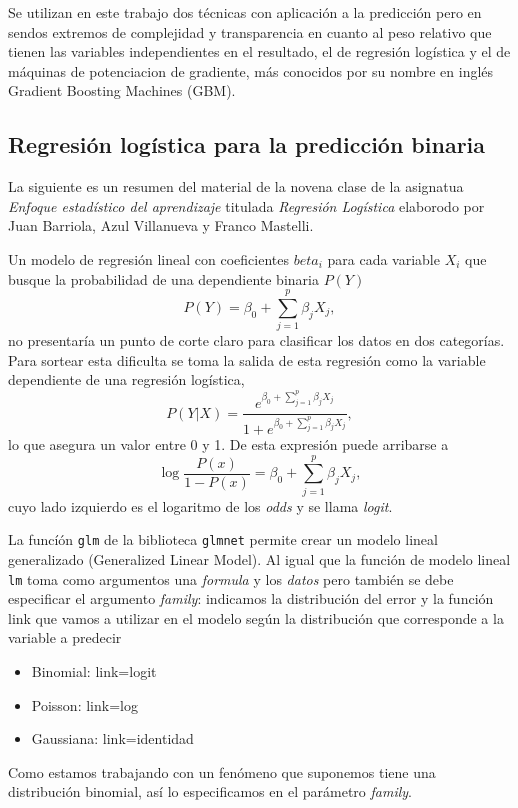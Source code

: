 \documentclass[a4paper]{report}
\begin{document}
Se utilizan en este trabajo dos técnicas con aplicación a la predicción pero en sendos extremos de complejidad y transparencia en cuanto al peso relativo que tienen las variables independientes en el resultado, el de regresión logística y el de máquinas de potenciacion de gradiente, más conocidos por su nombre en inglés Gradient Boosting Machines (GBM).


\subsection{Regresión logística para la predicción binaria}

La siguiente es un resumen del material de la novena clase de la asignatua \emph{Enfoque estadístico del aprendizaje} titulada \emph{Regresión Logística} elaborodo por Juan Barriola, Azul Villanueva y Franco Mastelli. 

Un modelo de regresión lineal con coeficientes \(beta_i\) para cada variable \(X_i\) que busque la probabilidad de una dependiente binaria \(P(Y)\)  
\[
P(Y) = \beta_0 + \sum\limits_{j=1}^p \beta_j X_j,	
\]
no presentaría un punto de corte claro para clasificar los datos en dos categorías.
Para sortear esta dificulta se toma la salida de esta regresión como la variable dependiente de una regresión logística,
\[
P(Y|X)= \frac{e^{\beta_0 + \sum\limits_{j=1}^p \beta_j X_j}}{1+e^{\beta_0 + \sum\limits_{j=1}^p \beta_j X_j}},
\]
lo que asegura un valor entre 0 y 1.
De esta expresión puede arribarse a 
\[
	\log {\frac{P(x)}{1-P(x)}}= \beta_0 + \sum\limits_{j=1}^p \beta_j X_j,
\]
cuyo lado izquierdo es el logaritmo de los \emph{odds} y se llama \emph{logit}. 

La funcíón \verb'glm' de la biblioteca \verb'glmnet' permite crear un modelo lineal generalizado (Generalized Linear Model).
Al igual que la función de modelo lineal \verb'lm' toma como argumentos una \emph{formula} y los \emph{datos} pero también se debe especificar el argumento \emph{family}: indicamos la distribución del error y la función link que vamos a utilizar en el modelo según la distribución que corresponde a la variable a predecir 
\begin{itemize}
	\item Binomial: link=logit
	\item Poisson: link=log
	\item Gaussiana: link=identidad
\end{itemize}
Como estamos trabajando con un fenómeno que suponemos tiene una distribución binomial, así lo especificamos en el parámetro \emph{family}.
\end{document}
